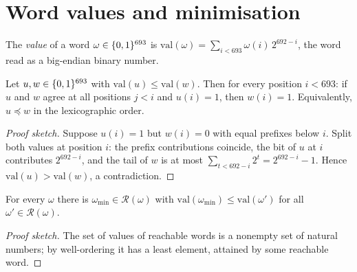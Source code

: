 \section{Word values and minimisation}

\begin{definition}\label{def:lex-word-val}
The \emph{value} of a word $\omega \in \{0,1\}^{693}$ is
$\mathrm{val}(\omega) = \sum_{i<693} \omega(i)\, 2^{692-i}$, the word read
as a big-endian binary number.
\leanok
{}
\end{definition}

\begin{lemma}\label{lem:lex-value-order}
Let $u, w \in \{0,1\}^{693}$ with $\mathrm{val}(u) \le \mathrm{val}(w)$.  Then
for every position $i < 693$: if $u$ and $w$ agree at all positions
$j < i$ and $u(i) = 1$, then $w(i) = 1$.  Equivalently, $u \preceq w$ in the
lexicographic order.
\leanok
{}
\end{lemma}

\begin{proof}[Proof sketch]
Suppose $u(i)=1$ but $w(i)=0$ with equal prefixes below $i$.  Split both
values at position $i$: the prefix contributions coincide, the bit of $u$ at
$i$ contributes $2^{692-i}$, and the tail of $w$ is at most
$\sum_{t<692-i} 2^t = 2^{692-i}-1$.  Hence
$\mathrm{val}(u) > \mathrm{val}(w)$, a contradiction.
\end{proof}

\begin{lemma}\label{lem:lex-min-reach}
For every $\omega$ there is $\omega_{\min} \in \mathcal{R}(\omega)$ with
$\mathrm{val}(\omega_{\min}) \le \mathrm{val}(\omega')$ for all
$\omega' \in \mathcal{R}(\omega)$.
\leanok
{}
\end{lemma}

\begin{proof}[Proof sketch]
The set of values of reachable words is a nonempty set of natural numbers;
by well-ordering it has a least element, attained by some reachable word.
\end{proof}

